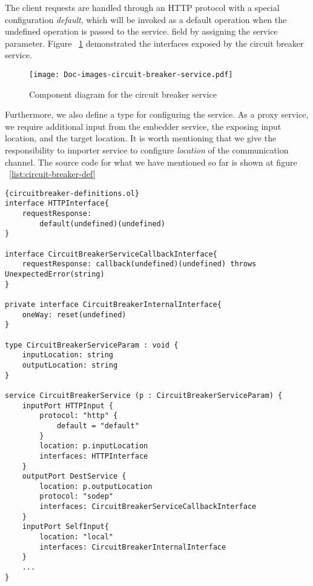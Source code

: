 The client requests are handled through an HTTP protocol with a special configuration \textit{default}, which will be invoked as a default operation when the undefined operation is passed to the service.  field by assigning the service parameter. Figure ~\ref{list:circuit-breaker-component-diagram} demonstrated the interfaces exposed by the circuit breaker service.

\begin{figure}
    \centering
    \texttt{[image: Doc-images-circuit-breaker-service.pdf]}
    \caption{Component diagram for the circuit breaker service}
    \label{list:circuit-breaker-component-diagram}
\end{figure}

Furthermore, we also define a type for configuring the service. As a proxy service, we require additional input from the embedder service, the exposing input location, and the target location. 
It is worth mentioning that we give the responsibility to importer service to configure \textit{location} of the communication channel. The source code for what we have mentioned so far is shown at figure ~\ref{list:circuit-breaker-def}

\renewcommand{\topfraction}{.85}
\renewcommand{\bottomfraction}{.7}
\renewcommand{\textfraction}{.15}
\renewcommand{\floatpagefraction}{.66}
\renewcommand{\dbltopfraction}{.66}
\renewcommand{\dblfloatpagefraction}{.66}
\setcounter{topnumber}{9}
\setcounter{bottomnumber}{9}
\setcounter{totalnumber}{20}
\setcounter{dbltopnumber}{9}

\begin{listing}[]
    \lstset{language=Jolie,
        style=codeStyle,
        basicstyle=\ttfamily\footnotesize
    }
    \begin{lstlisting}[frame=tlrb]{circuitbreaker-definitions.ol}
interface HTTPInterface{
    requestResponse:
        default(undefined)(undefined)
}

interface CircuitBreakerServiceCallbackInterface{
    requestResponse: callback(undefined)(undefined) throws UnexpectedError(string)
}

private interface CircuitBreakerInternalInterface{
    oneWay: reset(undefined)
}

type CircuitBreakerServiceParam : void {
    inputLocation: string
    outputLocation: string
}

service CircuitBreakerService (p : CircuitBreakerServiceParam) { 
    inputPort HTTPInput {
        protocol: "http" {
            default = "default"
        }
        location: p.inputLocation
        interfaces: HTTPInterface
    }
    outputPort DestService {
        location: p.outputLocation
        protocol: "sodep"
        interfaces: CircuitBreakerServiceCallbackInterface
    }
    inputPort SelfInput{
        location: "local"
        interfaces: CircuitBreakerInternalInterface
    }
    ...
}
\end{lstlisting}
\caption{Definitions and communication ports for the circuit breaker service}
\label{list:circuit-breaker-def}
\end{listing}

